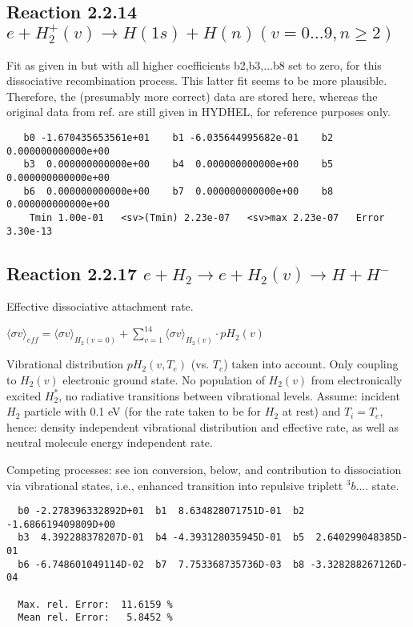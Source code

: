 \documentclass[12pt,dvipdfmx]{article}
\begin{document}
 \newpage
\subsection{
Reaction 2.2.14  $  e + H_2^+(v) \rightarrow H(1s) + H(n)   (v=0\ldots 9, n \geq 2)$}
Fit as given in \cite{kn:Janev}  but with all higher coefficients b2,b3,...b8 set to zero,
      for this dissociative recombination process.
      This latter fit seems to be more plausible. Therefore, the
      (presumably more correct)  data are stored here,
      whereas the original data from ref.\cite{kn:Janev} are still given in HYDHEL,
      for reference purposes only.



\begin{small}\begin{verbatim}
   b0 -1.670435653561e+01    b1 -6.035644995682e-01    b2  0.000000000000e+00
   b3  0.000000000000e+00    b4  0.000000000000e+00    b5  0.000000000000e+00
   b6  0.000000000000e+00    b7  0.000000000000e+00    b8  0.000000000000e+00
    Tmin 1.00e-01   <sv>(Tmin) 2.23e-07   <sv>max 2.23e-07   Error 3.30e-13
\end{verbatim}\end{small}


\newpage

\subsection{
Reaction 2.2.17  $e + H_2 \rightarrow e + H_2(v) \rightarrow H + H^-$
}
Effective dissociative attachment rate.

$ \langle\sigma v \rangle_{eff} = \langle\sigma v \rangle_{H_2(v=0)} + \sum_{v=1}^{14}
\langle\sigma v \rangle_{H_2(v)} \cdot pH_2(v) $

Vibrational distribution $pH_2(v,T_e)$ (vs. $T_e$) taken into
account. Only coupling
to $H_2(v)$ electronic ground state. No population of $H_2(v)$ from electronically
excited $H_2^*$, no radiative transitions between vibrational levels.
Assume: incident $H_2$ particle with 0.1 eV
(for the rate taken to be for $H_2$ at rest) and $T_i = T_e$,
hence: density independent vibrational distribution and effective
rate, as well as neutral molecule energy independent rate.

Competing processes: see ion conversion, below, and contribution to
dissociation via vibrational states, i.e., enhanced transition into
repulsive triplett $^3b....$ state.

\begin{small}\begin{verbatim}
  b0 -2.278396332892D+01  b1  8.634828071751D-01  b2 -1.686619409809D+00
  b3  4.392288378207D-01  b4 -4.393128035945D-01  b5  2.640299048385D-01
  b6 -6.748601049114D-02  b7  7.753368735736D-03  b8 -3.328288267126D-04

  Max. rel. Error:  11.6159 %
  Mean rel. Error:   5.8452 %
\end{verbatim}\end{small}
\end{document}
